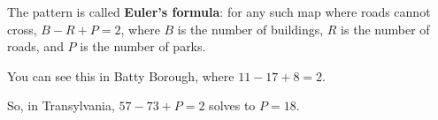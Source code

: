 


The pattern is called \textbf{Euler's formula}: for any such map where roads
cannot cross, \(B-R+P=2\), where \(B\) is the number of buildings,
\(R\) is the number of roads, and \(P\) is the number of parks.

You can see this in Batty Borough, where \(11-17+8=2\).

\begin{center}
\end{center}

So, in Transylvania, \(57-73+P=2\) solves to \(P=18\).

